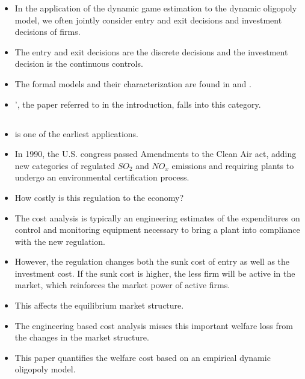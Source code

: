 \documentclass[
]{book}
\providecommand{\tightlist}{%
  \setlength{\itemsep}{0pt}\setlength{\parskip}{0pt}}
\begin{document}
\begin{itemize}
\tightlist
\item
  In the application of the dynamic game estimation to the dynamic oligopoly model, we often jointly consider entry and exit decisions and investment decisions of firms.
\item
  The entry and exit decisions are the discrete decisions and the investment decision is the continuous controls.
\item
  The formal models and their characterization are found in \citet{ericsonMarkovPerfectIndustryDynamics1995} and \citet{doraszelskiComputableMarkovperfectIndustry2010}.
\item
  \citet{Igami2018}', the paper referred to in the introduction, falls into this category.
\end{itemize}

\hypertarget{ryancostenvironmentregulation2012}{%
\subsection{\texorpdfstring{\citet{ryanCostEnvironmentRegulation2012}}{@ryanCostEnvironmentRegulation2012}}\label{ryancostenvironmentregulation2012}}

\begin{itemize}
\tightlist
\item
  \citet{ryanCostEnvironmentRegulation2012} is one of the earliest applications.
\item
  In 1990, the U.S. congress passed Amendments to the Clean Air act, adding new categories of regulated \(SO_2\) and \(NO_x\) emissions and requiring plants to undergo an environmental certification process.
\item
  How costly is this regulation to the economy?
\item
  The cost analysis is typically an engineering estimates of the expenditures on control and monitoring equipment necessary to bring a plant into compliance with the new regulation.
\item
  However, the regulation changes both the sunk cost of entry as well as the investment cost. If the sunk cost is higher, the less firm will be active in the market, which reinforces the market power of active firms.
\item
  This affects the equilibrium market structure.
\item
  The engineering based cost analysis misses this important welfare loss from the changes in the market structure.
\item
  This paper quantifies the welfare cost based on an empirical dynamic oligopoly model.
\end{itemize}
\end{document}
